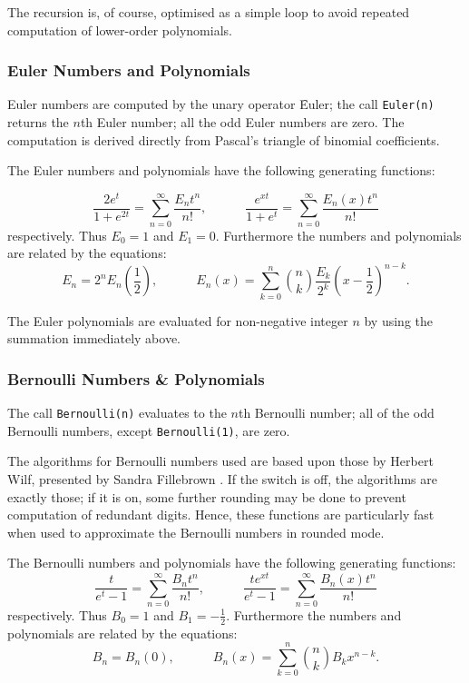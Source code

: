 The recursion is, of course, optimised as a simple loop to avoid repeated
computation of lower-order polynomials.

\subsubsection{Euler Numbers and Polynomials}
\hypertarget{EULERP}{}
Euler numbers are computed by the unary operator \f{Euler}; the
call \texttt{Euler(n)} returns the $n$th Euler number; all the odd Euler
numbers are zero. The computation is
derived directly from Pascal's triangle of binomial coefficients.

The Euler numbers and polynomials have the following generating functions:

\[\frac {2e^t} {1+e^{2t}} = \sum_{n=0}^{\infty}\frac{E_nt^n}{n!},\qquad\quad
\frac {e^{x t}} {1+e^t} = \sum_{n=0}^{\infty}\frac{E_n(x)t^n}{n!}\]
respectively.  Thus $E_0=1$ and $E_1=0$. Furthermore the numbers and
polynomials are related by the equations:
\[ E_n = 2^nE_n\left(\frac{1}{2}\right),\qquad\quad
E_n(x) = \sum_{k=0}^n \binom{n}{k} \frac{E_k}{2^k} \left(x-\frac{1}{2}\right)^{n-k}.\]

The Euler polynomials are evaluated for non-negative integer $n$ by using
the summation immediately above.

\subsubsection{Bernoulli Numbers \& Polynomials}
\hypertarget{BERNOULLIP}{}
The call \texttt{Bernoulli(n)}
evaluates to the $n$th Bernoulli number;
all of the odd Bernoulli numbers, except \texttt{Bernoulli(1)}, are
zero.

The algorithms for Bernoulli numbers used are based upon those by Herbert Wilf,
presented by Sandra Fillebrown \cite{Fillebrown:92}.
If the  switch is off,
the algorithms are exactly those; if it is on, some further rounding may
be done to prevent computation of redundant digits.  Hence, these
functions are particularly fast when used to approximate the Bernoulli
numbers in rounded mode.

The Bernoulli numbers and polynomials have the following generating functions:
\[ \frac {t} {e^t-1} = \sum_{n=0}^{\infty}\frac{B_nt^n}{n!},\qquad\quad
\frac {te^{x t}} {e^t -1} = \sum_{n=0}^{\infty}\frac{B_n(x)t^n}{n!}\]
respectively. Thus $B_0=1$ and $B_1=-\frac{1}{2}$. Furthermore the numbers and
polynomials are related by the equations:
\[ B_n= B_n(0),\qquad\quad  B_n(x) = \sum_{k=0}^n \binom{n}{k} B_kx^{n-k}.\]

